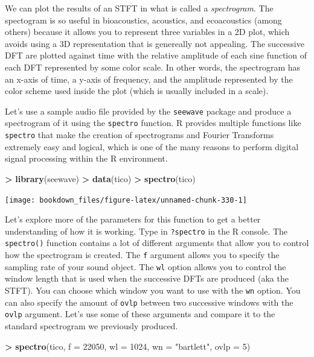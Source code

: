 \documentclass[]{krantz}
\makeatletter
\newenvironment{Shaded}{\begin{snugshade}}{\end{snugshade}}
\newcommand{\KeywordTok}[1]{\textcolor[rgb]{0.27,0.27,0.27}{\textbf{#1}}}
\newcommand{\DataTypeTok}[1]{\textcolor[rgb]{0.27,0.27,0.27}{#1}}
\newcommand{\DecValTok}[1]{\textcolor[rgb]{0.06,0.06,0.06}{#1}}
\newcommand{\StringTok}[1]{\textcolor[rgb]{0.5,0.5,0.5}{#1}}
\newcommand{\OperatorTok}[1]{\textcolor[rgb]{0.43,0.43,0.43}{\textbf{#1}}}
\newcommand{\NormalTok}[1]{#1}
\newenvironment{kframe}{%
\medskip{}
\setlength{\fboxsep}{.8em}
 \def\at@end@of@kframe{}%
 \ifinner\ifhmode%
  \def\at@end@of@kframe{\end{minipage}}%
  \begin{minipage}{\columnwidth}%
 \fi\fi%
 \def\FrameCommand##1{\hskip\@totalleftmargin \hskip-\fboxsep
 \colorbox{shadecolor}{##1}\hskip-\fboxsep
     \hskip-\linewidth \hskip-\@totalleftmargin \hskip\columnwidth}%
 \MakeFramed {\advance\hsize-\width
   \@totalleftmargin\z@ \linewidth\hsize
   \@setminipage}}%
 {\par\unskip\endMakeFramed%
 \at@end@of@kframe}
\renewenvironment{Shaded}{\begin{kframe}}{\end{kframe}}
\makeatother
\begin{document}
We can plot the results of an STFT in what is called a
\emph{spectrogram}. The spectogram is so useful in bioacoustics,
acoustics, and ecoacoustics (among others) because it allows you to
represent three variables in a 2D plot, which avoids using a 3D
representation that is genereally not appealing. The successive DFT are
plotted against time with the relative amplitude of each sine function
of each DFT represented by some color scale. In other words, the
spectrogram has an x-axis of time, a y-axis of frequency, and the
amplitude represented by the color scheme used inside the plot (which is
usually included in a scale).

Let's use a sample audio file provided by the \texttt{seewave} package
and produce a spectrogram of it using the \texttt{spectro} function. R
provides multiple functions like \texttt{spectro} that make the creation
of spectrograms and Fourier Transforms extremely easy and logical, which
is one of the many reasons to perform digital signal processing within
the R environment.

\begin{Shaded}
\begin{Highlighting}[]
\OperatorTok{>}\StringTok{ }\KeywordTok{library}\NormalTok{(seewave)}
\OperatorTok{>}\StringTok{ }\KeywordTok{data}\NormalTok{(tico)}
\OperatorTok{>}\StringTok{ }\KeywordTok{spectro}\NormalTok{(tico)}
\end{Highlighting}
\end{Shaded}

\texttt{[image: bookdown\_files/figure-latex/unnamed-chunk-330-1]}

Let's explore more of the parameters for this function to get a better
understanding of how it is working. Type in \texttt{?spectro} in the R
console. The \texttt{spectro()} function contains a lot of different
arguments that allow you to control how the spectrogram is created. The
\texttt{f} argument allows you to specify the sampling rate of your
sound object. The \texttt{wl} option allows you to control the window
length that is used when the successive DFTs are produced (aka the
STFT). You can choose which window you want to use with the \texttt{wn}
option. You can also specify the amount of \texttt{ovlp} between two
successive windows with the \texttt{ovlp} argument. Let's use some of
these arguments and compare it to the standard spectrogram we previously
produced.

\begin{Shaded}
\begin{Highlighting}[]
\OperatorTok{>}\StringTok{ }\KeywordTok{spectro}\NormalTok{(tico, }\DataTypeTok{f =} \DecValTok{22050}\NormalTok{, }\DataTypeTok{wl =} \DecValTok{1024}\NormalTok{, }\DataTypeTok{wn =} \StringTok{"bartlett"}\NormalTok{, }\DataTypeTok{ovlp =} \DecValTok{5}\NormalTok{)}
\end{Highlighting}
\end{Shaded}
\end{document}
